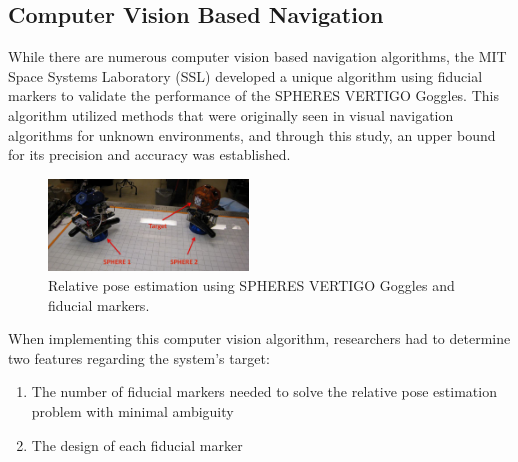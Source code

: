 \documentclass[journal, 10pt]{IEEEtran}
\begin{document}
\subsection{Computer Vision Based Navigation}

While there are numerous computer vision based navigation algorithms, the MIT Space Systems Laboratory (SSL) developed a unique algorithm using fiducial markers to validate the performance of the SPHERES VERTIGO Goggles. This algorithm utilized methods that were originally seen in visual navigation algorithms for unknown environments, and through this study, an upper bound for its precision and accuracy was established.

\begin{figure}[tb]
\begin{center}
\includegraphics[width=0.475\textwidth]{figures/pose_est.pdf}
\caption{Relative pose estimation using SPHERES VERTIGO Goggles and fiducial markers.}
\label{target_plot}
\end{center}
\end{figure}

When implementing this computer vision algorithm, researchers had to determine two features regarding the system's target:
\begin{enumerate}
\item The number of fiducial markers needed to solve the relative pose estimation problem with minimal ambiguity
\item The design of each fiducial marker
\end{enumerate}
\end{document}
